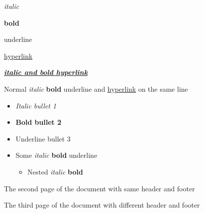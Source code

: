 \documentclass[11pt,a4paper]{article}
\begin{document}
\textit{italic}

\textbf{bold}

underline

\href{https://github.com/DS4SD/docling}{hyperlink}

\href{https://github.com/DS4SD/docling}{\textit{\textbf{italic and bold hyperlink}}}

Normal \textit{italic} \textbf{bold} underline and \href{https://github.com/DS4SD/docling}{hyperlink} on the same line

\begin{itemize}
\item \textit{Italic bullet 1}
\item \textbf{Bold bullet 2}
\item Underline bullet 3
\item Some \textit{italic} \textbf{bold} underline
  \begin{itemize}
\item Nested \textit{italic} \textbf{bold}
  \end{itemize}
\end{itemize}

The second page of the document with same header and footer

The third page of the document with different header and footer
\end{document}
